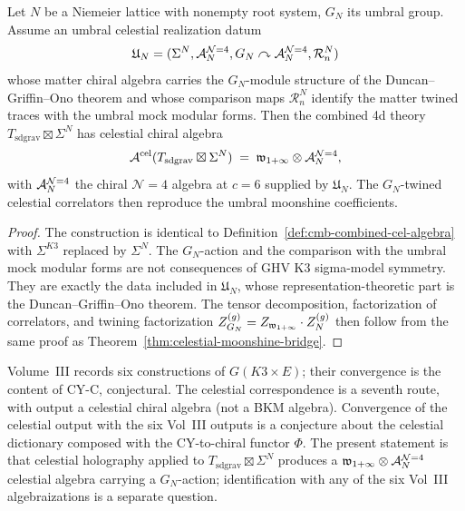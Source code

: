 \begin{proposition}
\label{prop:umbral-celestial-correspondence}
Let $N$ be a Niemeier lattice with nonempty root system, $G_N$ its
umbral group. Assume an umbral celestial realization datum
\[
\mathfrak U_N=(\Sigma^N,\mathcal A_N^{\mathcal N=4},G_N\curvearrowright
\mathcal A_N^{\mathcal N=4},\mathcal R^N_n)
\]
whose matter chiral algebra carries the \(G_N\)-module structure of
the Duncan--Griffin--Ono theorem and whose comparison maps
\(\mathcal R^N_n\) identify the matter twined traces with the umbral
mock modular forms. Then the combined 4d theory
$T_{\mathrm{sd grav}} \boxtimes \Sigma^N$ has celestial chiral algebra
\[
\mathcal A^{\mathrm{cel}}(T_{\mathrm{sd grav}} \boxtimes \Sigma^N)
\;=\;
\mathfrak w_{1+\infty} \otimes \mathcal A^{\mathcal{N}{=}4}_{N},
\]
with $\mathcal A^{\mathcal{N}{=}4}_{N}$ the chiral $\mathcal{N}{=}4$ algebra at
$c = 6$ supplied by \(\mathfrak U_N\). The \(G_N\)-twined celestial
correlators then reproduce the umbral moonshine coefficients.
\end{proposition}

\begin{proof}
The construction is identical to
Definition~\ref{def:cmb-combined-cel-algebra} with $\Sigma^{K3}$
replaced by $\Sigma^N$. The \(G_N\)-action and the comparison with the
umbral mock modular forms are not consequences of GHV K3 sigma-model
symmetry. They are exactly the data included in \(\mathfrak U_N\),
whose representation-theoretic part is the Duncan--Griffin--Ono
theorem. The tensor decomposition, factorization of correlators, and
twining factorization \(Z_{G_N}^{(g)}=Z_{\mathfrak w_{1+\infty}}\cdot Z_N^{(g)}\) then
follow from the same proof as
Theorem~\ref{thm:celestial-moonshine-bridge}.
\end{proof}

\begin{remark}
\label{rem:cmb-six-routes-one-output}
Volume~III records six constructions of $G(K3 \times E)$;
their convergence is the content of CY-C, conjectural. The
celestial correspondence is a seventh route,
with output a celestial chiral algebra (not a BKM algebra).
Convergence of the celestial output with the six Vol~III outputs is
a conjecture about the celestial dictionary composed with the CY-to-chiral
functor $\Phi$. The present statement is that celestial holography
applied to $T_{\mathrm{sd grav}} \boxtimes \Sigma^N$
produces a $\mathfrak w_{1+\infty} \otimes \mathcal A^{\mathcal{N}{=}4}_{N}$ celestial algebra
carrying a $G_N$-action; identification with any of the six Vol~III
algebraizations is a separate question.
\end{remark}

